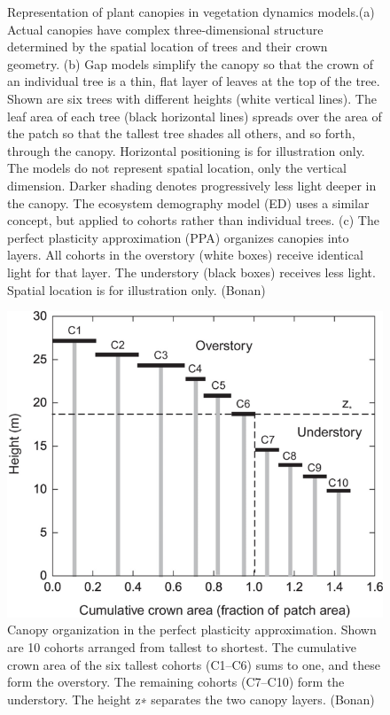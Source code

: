\documentclass[
  12pt,
  oneside]{book}
\begin{document}
\begin{figure}
{}

\caption{Representation of plant canopies in vegetation dynamics models.(a) Actual canopies have complex three-dimensional structure determined by the spatial location of trees and their crown geometry. (b) Gap models simplify the canopy so that the crown of an individual tree is a thin, flat layer of leaves at the top of the tree. Shown are six trees with different heights (white vertical lines). The leaf area of each tree (black horizontal lines) spreads over the area of the patch so that the tallest tree shades all others, and so forth, through the canopy. Horizontal positioning is for illustration only. The models do not represent spatial location, only the vertical dimension. Darker shading denotes progressively less light deeper in the canopy. The ecosystem demography model (ED) uses a similar concept, but applied to cohorts rather than individual trees. (c) The perfect plasticity approximation (PPA) organizes canopies into layers. All cohorts in the overstory (white boxes) receive identical light for that layer. The understory (black boxes) receives less light. Spatial location is for illustration only. (Bonan)}\label{fig:f627}
\end{figure}

\begin{figure}

{\centering \includegraphics[width=0.8\linewidth]{figures/chap6/f628_ppa} 

}

\caption{Canopy organization in the perfect plasticity approximation. Shown are 10 cohorts arranged from tallest to shortest. The cumulative crown area of the six tallest cohorts (C1–C6) sums to one, and these form the overstory. The remaining cohorts (C7–C10) form the understory. The height z∗ separates the two canopy layers. (Bonan)}\label{fig:f628}
\end{figure}
\end{document}
